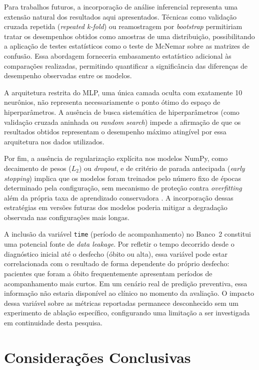 Para trabalhos futuros, a incorporação de análise inferencial representa uma extensão natural dos resultados aqui apresentados. Técnicas como validação cruzada repetida (\textit{repeated k-fold}) ou reamostragem por \textit{bootstrap} permitiriam tratar os desempenhos obtidos como amostras de uma distribuição, possibilitando a aplicação de testes estatísticos como o teste de McNemar sobre as matrizes de confusão. Essa abordagem forneceria embasamento estatístico adicional às comparações realizadas, permitindo quantificar a significância das diferenças de desempenho observadas entre os modelos.

A arquitetura restrita do MLP, uma única camada oculta com exatamente 10 neurônios, não representa necessariamente o ponto ótimo do espaço de hiperparâmetros. A ausência de busca sistemática de hiperparâmetros (como validação cruzada aninhada ou \textit{random search}) impede a afirmação de que os resultados obtidos representam o desempenho máximo atingível por essa arquitetura nos dados utilizados.

Por fim, a ausência de regularização explícita nos modelos NumPy, como decaimento de pesos ($L_2$) ou \textit{dropout}, e de critério de parada antecipada (\textit{early stopping}) implica que os modelos foram treinados pelo número fixo de épocas determinado pela configuração, sem mecanismo de proteção contra \textit{overfitting} além da própria taxa de aprendizado conservadora \cite{silva2016}. A incorporação dessas estratégias em versões futuras dos modelos poderia mitigar a degradação observada nas configurações mais longas.

A inclusão da variável \texttt{time} (período de acompanhamento) no Banco~2 constitui uma potencial fonte de \textit{data leakage}. Por refletir o tempo decorrido desde o diagnóstico inicial até o desfecho (óbito ou alta), essa variável pode estar correlacionada com o resultado de forma dependente do próprio desfecho: pacientes que foram a óbito frequentemente apresentam períodos de acompanhamento mais curtos. Em um cenário real de predição preventiva, essa informação não estaria disponível ao clínico no momento da avaliação. O impacto dessa variável sobre as métricas reportadas permanece desconhecido sem um experimento de ablação específico, configurando uma limitação a ser investigada em continuidade desta pesquisa.

\section{Considerações Conclusivas}

